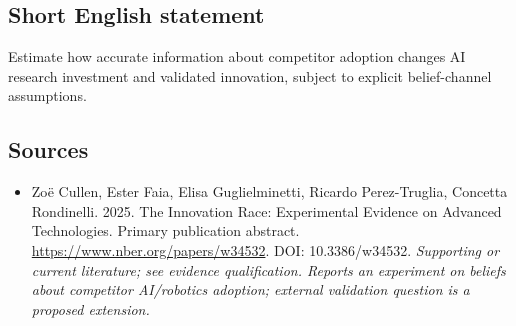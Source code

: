 \documentclass[11pt]{article}
\begin{document}
\subsection{Short English statement}
Estimate how accurate information about competitor adoption changes AI research investment and validated innovation, subject to explicit belief-channel assumptions.

\subsection{Sources}
\begin{itemize}\raggedright
\item[\textnormal{[S1]}]\hypertarget{source:30007695:1}{} Zoë Cullen, Ester Faia, Elisa Guglielminetti, Ricardo Perez-Truglia, Concetta Rondinelli. 2025. The Innovation Race: Experimental Evidence on Advanced Technologies. Primary publication abstract.
\url{https://www.nber.org/papers/w34532}.
DOI: 10.3386/w34532.
{\small\textit{Supporting or current literature; see evidence qualification. Reports an experiment on beliefs about competitor AI/robotics adoption; external validation question is a proposed extension.}}
\end{itemize}
\end{document}
